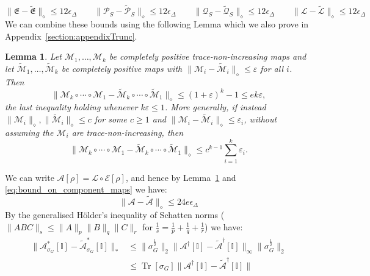 \documentclass[aps,floatfix,10pt,amssymb,amsfont,amsmath,superscriptaddress,float,nofootinbib,longbibliography,nobalancelastpage,twocolumn]{revtex4-2}
\newtheorem{lemma}{Lemma}
\begin{document}
\begin{equation}
    \|\mathfrak{E} - \tilde{\mathfrak{E}}\|_{\diamond} \leq 12\epsilon_{\Delta} \qquad\|\mathcal{P}_S - \tilde{\mathcal{P}}_S\|_{\diamond} \leq 12\epsilon_{\Delta} \qquad\|\mathcal{Q}_S - \tilde{\mathcal{Q}}_S\|_{\diamond} \leq 12\epsilon_{\Delta} \qquad\|\mathcal{L} - \tilde{\mathcal{L}}\|_{\diamond} \leq 12\epsilon_{\Delta}
    \label{eq:bound_on_component_maps}
\end{equation}
We can combine these bounds using the following Lemma which we also prove in Appendix~\ref{section:appendixTrunc}.
\begin{lemma}
\label{lemma:composition}
Let $\mathcal{M}_1, \ldots, \mathcal{M}_k$ be completely positive trace-non-increasing maps and let $\tilde{\mathcal{M}}_1, \ldots, \tilde{\mathcal{M}}_k$ be completely positive maps with $\|\mathcal{M}_i - \tilde{\mathcal{M}}_i\|_{\diamond} \leq \varepsilon$ for all $i$. Then
\begin{equation}
    \|\mathcal{M}_k \circ \cdots \circ \mathcal{M}_1 - \tilde{\mathcal{M}}_k \circ \cdots \circ \tilde{\mathcal{M}}_1\|_{\diamond} \leq (1+\varepsilon)^k - 1 \leq e k \varepsilon,
\end{equation}
the last inequality holding whenever $k\varepsilon \leq 1$. More generally, if instead $\|\mathcal{M}_i\|_{\diamond}, \|\tilde{\mathcal{M}}_i\|_{\diamond} \leq c$ for some $c \geq 1$ and $\|\mathcal{M}_i - \tilde{\mathcal{M}}_i\|_{\diamond} \leq \varepsilon_i$, without assuming the $\mathcal{M}_i$ are trace-non-increasing, then
\begin{equation}
    \|\mathcal{M}_k \circ \cdots \circ \mathcal{M}_1 - \tilde{\mathcal{M}}_k \circ \cdots \circ \tilde{\mathcal{M}}_1\|_{\diamond} \leq c^{k-1}\sum_{i=1}^{k}\varepsilon_i .
\end{equation}
\end{lemma}
We can write $\mathcal{A}[\rho] = \mathcal{L} \circ \mathcal{E}[\rho]$, and hence by Lemma~\ref{lemma:composition} and \eqref{eq:bound_on_component_maps} we have:
\begin{equation}
    \|\mathcal{A} - \tilde{\mathcal{A}}\|_{\diamond} \leq 24e \epsilon_{\Delta}
\end{equation}
By the generalised H\"older's inequality of Schatten norms ($\|ABC\|_s \leq \|A\|_p\|B\|_q\|C\|_r$ for $\frac{1}{s} = \frac{1}{p}+ \frac{1}{q} + \frac{1}{r}$) we have:
\begin{align}
    \|\mathcal{A}^*_{\sigma_G}[\mathbb{I}] - \tilde{\mathcal{A}}^*_{\sigma_G}[\mathbb{I}]\|_* &\leq \|\sigma_G^{\frac{1}{2}}\|_2\|\mathcal{A}^{\dagger}[\mathbb{I}] - \tilde{\mathcal{A}}^{\dagger}[\mathbb{I}]\|_{\infty} \|\sigma_G^{\frac{1}{2}}\|_2\\
    &\leq \operatorname{Tr}[\sigma_G]\|\mathcal{A}^{\dagger}[\mathbb{I}] - \tilde{\mathcal{A}}^{\dagger}[\mathbb{I}]\|
\end{align}
\end{document}
